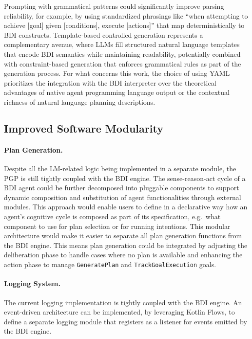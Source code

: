\documentclass[12pt,a4paper,openright,twoside]{book}
\begin{document}
Prompting with grammatical patterns could significantly improve parsing reliability, for example, by using standardized phrasings like ``when attempting to achieve [goal] given [conditions], execute [actions]'' that map deterministically to BDI constructs.
%
Template-based controlled generation represents a complementary avenue, where LLMs fill structured natural language templates that encode BDI semantics while maintaining readability, potentially combined with constraint-based generation that enforces grammatical rules as part of the generation process.
%
For what concerns this work, the choice of using YAML prioritizes the integration with the BDI interpreter over the theoretical advantages of native agent programming language output or the contextual richness of natural language planning descriptions.

\subsection{Improved Software Modularity}\label{sec:modularity}

\paragraph{Plan Generation.} Despite all the LM-related logic being implemented in a separate module, the PGP is still tightly coupled with the BDI engine.
%
The sense-reason-act cycle of a BDI agent  could be further decomposed into pluggable components to support dynamic composition and substitution of agent functionalities through external modules. 
%
This approach would enable users to define in a declarative way how an agent's cognitive cycle is composed as part of its specification, e.g.\ what component to use for plan selection or for running intentions.
%
This modular architecture would make it easier to separate all plan generation functions from the BDI engine.
%
This means plan generation could be integrated by adjusting the deliberation phase to handle cases where no plan is available and enhancing the action phase to manage \texttt{GeneratePlan} and \texttt{TrackGoalExecution} goals.

\paragraph{Logging System.} The current logging implementation is tightly coupled with the BDI engine. An event-driven architecture can be implemented, by leveraging Kotlin Flows, to define a separate logging module that registers as a listener for events emitted by the BDI engine.
\end{document}
